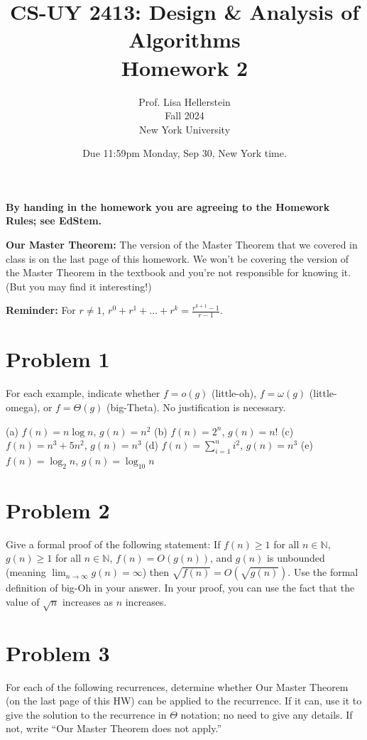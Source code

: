 \documentclass{article}
\begin{document}
\title{CS-UY 2413: Design \& Analysis of Algorithms \\ Homework 2}
\author{Prof. Lisa Hellerstein \\ Fall 2024 \\ New York University}
\date{Due 11:59pm Monday, Sep 30, New York time.}

\maketitle

\textbf{By handing in the homework you are agreeing to the Homework Rules; see EdStem.}

\textbf{Our Master Theorem:} The version of the Master Theorem that we covered in class is on the last page of this homework. We won’t be covering the version of the Master Theorem in the textbook and you’re not responsible for knowing it. (But you may find it interesting!)

\textbf{Reminder:} For $r \neq 1$, $r^0 + r^1 + \dots + r^k = \frac{r^{k+1}-1}{r-1}$.

\section*{Problem 1}
For each example, indicate whether $f = o(g)$ (little-oh), $f = \omega(g)$ (little-omega), or $f = \Theta(g)$ (big-Theta). No justification is necessary.

(a) $f(n) = n \log n$, $g(n) = n^2$
(b) $f(n) = 2^n$, $g(n) = n!$
(c) $f(n) = n^3 + 5n^2$, $g(n) = n^3$
(d) $f(n) = \sum_{i=1}^n i^2$, $g(n) = n^3$
(e) $f(n) = \log_2 n$, $g(n) = \log_{10} n$

\section*{Problem 2}
Give a formal proof of the following statement: If $f(n) \ge 1$ for all $n \in \mathbb{N}$, $g(n) \ge 1$ for all $n \in \mathbb{N}$, $f(n) = O(g(n))$, and $g(n)$ is unbounded (meaning $\lim_{n\to\infty} g(n) = \infty$) then $\sqrt{f(n)} = O(\sqrt{g(n)})$.
Use the formal definition of big-Oh in your answer. In your proof, you can use the fact that the value of $\sqrt{n}$ increases as $n$ increases.


\section*{Problem 3}
For each of the following recurrences, determine whether Our Master Theorem (on the last page of this HW) can be applied to the recurrence. If it can, use it to give the solution to the recurrence in $\Theta$ notation; no need to give any details. If not, write “Our Master Theorem does not apply.”
\end{document}
